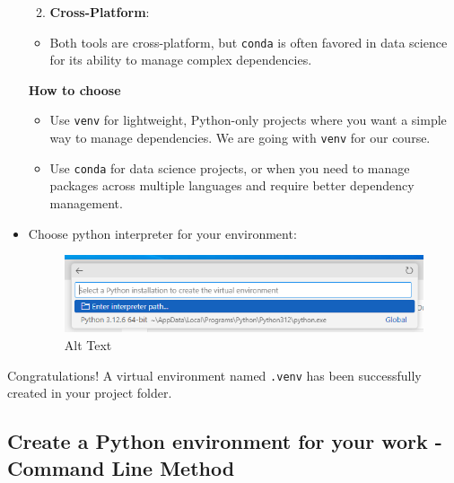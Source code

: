 \documentclass[
  letterpaper,
  DIV=11,
  numbers=noendperiod]{scrreprt}
\providecommand{\tightlist}{%
  \setlength{\itemsep}{0pt}\setlength{\parskip}{0pt}}\usepackage{longtable,booktabs,array}
\begin{document}
\begin{itemize}
  \begin{enumerate}
  \def\labelenumi{\arabic{enumi}.}
  \setcounter{enumi}{3}
  \tightlist
  \item
    \textbf{Cross-Platform}:
  \end{enumerate}

  \begin{itemize}
  \tightlist
  \item
    Both tools are cross-platform, but \texttt{conda} is often favored
    in data science for its ability to manage complex dependencies.
  \end{itemize}

  \textbf{How to choose}

  \begin{itemize}
  \tightlist
  \item
    Use \texttt{venv} for lightweight, Python-only projects where you
    want a simple way to manage dependencies. We are going with
    \texttt{venv} for our course.
  \item
    Use \texttt{conda} for data science projects, or when you need to
    manage packages across multiple languages and require better
    dependency management.
  \end{itemize}
\item
  Choose python interpreter for your environment:

  \begin{figure}

  {\centering \includegraphics{images/interpreter.png}

  }

  \caption{Alt Text}

  \end{figure}
\end{itemize}

Congratulations! A virtual environment named \texttt{.venv} has been
successfully created in your project folder.

\hypertarget{create-a-python-environment-for-your-work---command-line-method}{%
\subsection{Create a Python environment for your work - Command Line
Method}\label{create-a-python-environment-for-your-work---command-line-method}}
\end{document}

